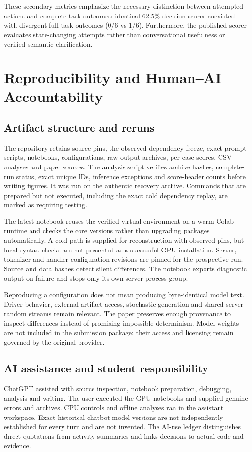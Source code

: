 \documentclass[conference]{IEEEtran}
\begin{document}
These secondary metrics emphasize the necessary distinction between attempted actions and complete-task outcomes: identical 62.5\% decision scores coexisted with divergent full-task outcomes (0/6 vs 1/6). Furthermore, the published scorer evaluates state-changing attempts rather than conversational usefulness or verified semantic clarification.

\section{Reproducibility and Human--AI Accountability}
\subsection{Artifact structure and reruns}
The repository retains source pins, the observed dependency freeze, exact prompt scripts, notebooks, configurations, raw output archives, per-case scores, CSV analyses and paper sources. The analysis script verifies archive hashes, complete-run status, exact unique IDs, inference exceptions and score-header counts before writing figures. It was run on the authentic recovery archive. Commands that are prepared but not executed, including the exact cold dependency replay, are marked as requiring testing.

The latest notebook reuses the verified virtual environment on a warm Colab runtime and checks the core versions rather than upgrading packages automatically. A cold path is supplied for reconstruction with observed pins, but local syntax checks are not presented as a successful GPU installation. Server, tokenizer and handler configuration revisions are pinned for the prospective run. Source and data hashes detect silent differences. The notebook exports diagnostic output on failure and stops only its own server process group.

Reproducing a configuration does not mean producing byte-identical model text. Driver behavior, external artifact access, stochastic generation and shared server random streams remain relevant. The paper preserves enough provenance to inspect differences instead of promising impossible determinism. Model weights are not included in the submission package; their access and licensing remain governed by the original provider.

\subsection{AI assistance and student responsibility}
ChatGPT assisted with source inspection, notebook preparation, debugging, analysis and writing. The user executed the GPU notebooks and supplied genuine errors and archives. CPU controls and offline analyses ran in the assistant workspace. Exact historical chatbot model versions are not independently established for every turn and are not invented. The AI-use ledger distinguishes direct quotations from activity summaries and links decisions to actual code and evidence.
\end{document}
